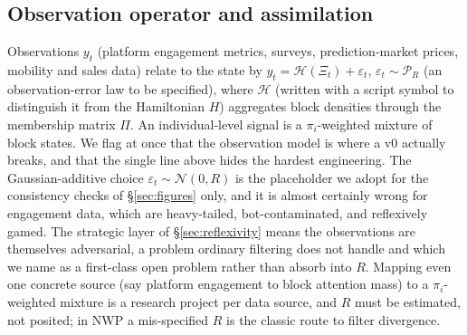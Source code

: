\documentclass[11pt]{article}
\begin{document}
\subsection{Observation operator and assimilation}

Observations $y_t$ (platform engagement metrics, surveys, prediction-market prices, mobility and sales data) relate to the state by $y_t = \mathcal{H}(\Xi_t) + \varepsilon_t$, $\varepsilon_t \sim \mathcal{P}_R$ (an observation-error law to be specified), where $\mathcal{H}$ (written with a script symbol to distinguish it from the Hamiltonian $H$) aggregates block densities through the membership matrix $\Pi$. An individual-level signal is a $\pi_i$-weighted mixture of block states. We flag at once that the observation model is where a v0 actually breaks, and that the single line above hides the hardest engineering. The Gaussian-additive choice $\varepsilon_t\sim\mathcal{N}(0,R)$ is the placeholder we adopt for the consistency checks of \S\ref{sec:figures} only, and it is almost certainly wrong for engagement data, which are heavy-tailed, bot-contaminated, and reflexively gamed. The strategic layer of \S\ref{sec:reflexivity} means the observations are themselves adversarial, a problem ordinary filtering does not handle and which we name as a first-class open problem rather than absorb into $R$. Mapping even one concrete source (say platform engagement to block attention mass) to a $\pi_i$-weighted mixture is a research project per data source, and $R$ must be estimated, not posited; in NWP a mis-specified $R$ is the classic route to filter divergence.
\end{document}
